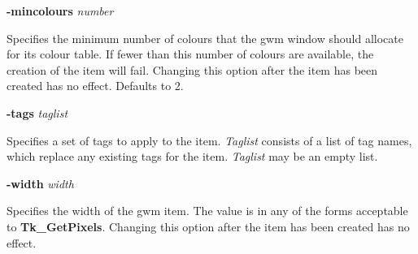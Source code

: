 {\bf -mincolours} {\em number}
\begin{rquote}
Specifies the minimum number of colours that the gwm window should allocate 
for its colour table. If fewer than this number of colours are available,
the creation of the item will fail. Changing this option after the item
has been created has no effect. Defaults to 2.
\end{rquote}

%

{\bf -tags} {\em taglist}
\begin{rquote}
Specifies a set of tags to apply to the item. {\em Taglist} consists
of a list of tag names, which replace any existing tags for the item.
{\em Taglist} may be an empty list.
\end{rquote}

{\bf -width} {\em width}
\begin{rquote}
Specifies the width of the gwm item. The value is in any of the forms
acceptable to {\bf Tk\_GetPixels}. Changing this option after the item 
has been created has no effect.
\end{rquote}

%
%


